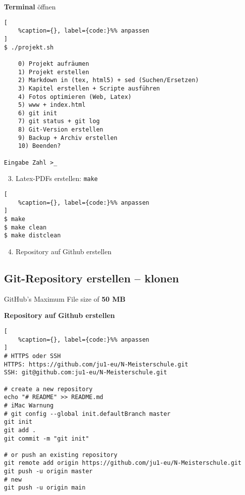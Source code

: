 \textbf{Terminal} öffnen

\lstset{language=Python}%
\begin{lstlisting}[
	%caption={}, label={code:}%% anpassen
]
$ ./projekt.sh

    0) Projekt aufräumen
    1) Projekt erstellen
    2) Markdown in (tex, html5) + sed (Suchen/Ersetzen)
    3) Kapitel erstellen + Scripte ausführen
    4) Fotos optimieren (Web, Latex)
    5) www + index.html
    6) git init
    7) git status + git log
    8) Git-Version erstellen
    9) Backup + Archiv erstellen
    10) Beenden?

Eingabe Zahl >_
\end{lstlisting}

\begin{enumerate}
\setcounter{enumi}{2}
\item
  Latex-PDFs erstellen: \verb|make|
\end{enumerate}

\lstset{language=Python}%
\begin{lstlisting}[
	%caption={}, label={code:}%% anpassen
]
$ make
$ make clean
$ make distclean
\end{lstlisting}

\begin{enumerate}
\setcounter{enumi}{3}
\item
  Repository auf Github erstellen
\end{enumerate}

\subsection{Git-Repository erstellen --
klonen}\label{git-repository-erstellen-klonen}

GitHub's Maximum File size of \textbf{50 MB}

\textbf{Repository auf Github erstellen}

\lstset{language=Python}%
\begin{lstlisting}[
	%caption={}, label={code:}%% anpassen
]
# HTTPS oder SSH
HTTPS: https://github.com/ju1-eu/N-Meisterschule.git
SSH: git@github.com:ju1-eu/N-Meisterschule.git

# create a new repository 
echo "# README" >> README.md
# iMac Warnung 
# git config --global init.defaultBranch master
git init
git add .
git commit -m "git init"
                
# or push an existing repository 
git remote add origin https://github.com/ju1-eu/N-Meisterschule.git
git push -u origin master
# new
git push -u origin main
\end{lstlisting}

